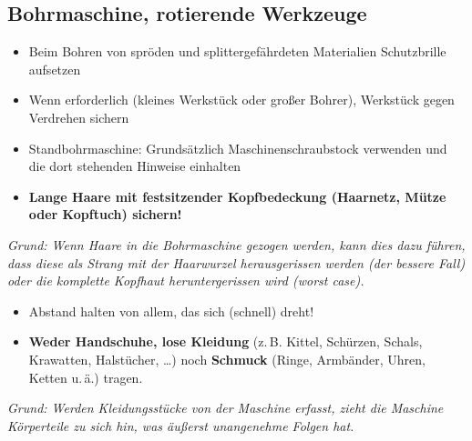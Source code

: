 \documentclass[13pt]{\basedir/fablab-document}
\begin{document}

\subsection{Bohrmaschine, rotierende Werkzeuge}



\begin{itemize}
	\item Beim Bohren von spröden und splittergefährdeten Materialien Schutzbrille aufsetzen
	\item Wenn erforderlich (kleines Werkstück oder großer Bohrer), Werkstück gegen Verdrehen sichern
	\item Standbohrmaschine: Grundsätzlich Maschinenschraubstock verwenden und die dort stehenden Hinweise einhalten
	\item \textbf{Lange Haare mit festsitzender Kopfbedeckung (Haarnetz, Mütze oder Kopftuch) sichern!}
\end{itemize}
\textit{Grund: Wenn Haare in die Bohrmaschine gezogen werden, kann dies dazu führen, dass diese als Strang mit der Haarwurzel herausgerissen werden (der bessere Fall) oder die komplette Kopfhaut heruntergerissen wird (worst case).}

\begin{itemize}
	\item Abstand halten von allem, das sich (schnell) dreht!
	\item \textbf{Weder Handschuhe, lose Kleidung} (z.\,B. Kittel, Schürzen, Schals, Krawatten, Halstücher, \dots) noch \textbf{Schmuck} (Ringe, Arm\-bänder, Uhren, Ketten u.\,ä.) tragen.
\end{itemize}
\textit{Grund: Werden Kleidungsstücke von der Maschine erfasst, zieht die Maschine Körperteile zu sich hin, was äußerst unangenehme Folgen hat.}
\end{document}
